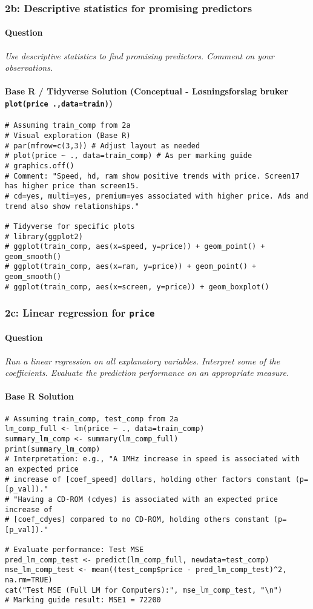 \documentclass[12pt,a4paper]{article}
\newcommand{\Rcode}[1]{\texttt{#1}} %
\begin{document}
    \subsubsection{2b: Descriptive statistics for promising predictors}
        \paragraph{Question}
        \textit{Use descriptive statistics to find promising predictors. Comment on your observations.}
        \paragraph{Base R / Tidyverse Solution (Conceptual - Løsningsforslag bruker \Rcode{plot(price~.,data=train)})}
\begin{lstlisting}
# Assuming train_comp from 2a
# Visual exploration (Base R)
# par(mfrow=c(3,3)) # Adjust layout as needed
# plot(price ~ ., data=train_comp) # As per marking guide
# graphics.off()
# Comment: "Speed, hd, ram show positive trends with price. Screen17 has higher price than screen15.
# cd=yes, multi=yes, premium=yes associated with higher price. Ads and trend also show relationships."

# Tidyverse for specific plots
# library(ggplot2)
# ggplot(train_comp, aes(x=speed, y=price)) + geom_point() + geom_smooth()
# ggplot(train_comp, aes(x=ram, y=price)) + geom_point() + geom_smooth()
# ggplot(train_comp, aes(x=screen, y=price)) + geom_boxplot()
\end{lstlisting}

    \subsubsection{2c: Linear regression for \Rcode{price}}
        \paragraph{Question}
        \textit{Run a linear regression on all explanatory variables. Interpret some of the coefficients. Evaluate the prediction performance on an appropriate measure.}
        \paragraph{Base R Solution}
\begin{lstlisting}
# Assuming train_comp, test_comp from 2a
lm_comp_full <- lm(price ~ ., data=train_comp)
summary_lm_comp <- summary(lm_comp_full)
print(summary_lm_comp)
# Interpretation: e.g., "A 1MHz increase in speed is associated with an expected price
# increase of [coef_speed] dollars, holding other factors constant (p=[p_val])."
# "Having a CD-ROM (cdyes) is associated with an expected price increase of 
# [coef_cdyes] compared to no CD-ROM, holding others constant (p=[p_val])."

# Evaluate performance: Test MSE
pred_lm_comp_test <- predict(lm_comp_full, newdata=test_comp)
mse_lm_comp_test <- mean((test_comp$price - pred_lm_comp_test)^2, na.rm=TRUE)
cat("Test MSE (Full LM for Computers):", mse_lm_comp_test, "\n")
# Marking guide result: MSE1 = 72200
\end{lstlisting}
\end{document}
